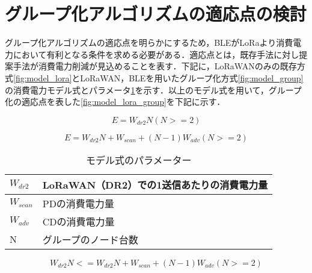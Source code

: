 \section{グループ化アルゴリズムの適応点の検討}
グループ化アルゴリズムの適応点を明らかにするため，BLEがLoRaより消費電力において有利となる条件を求める必要がある．適応点とは，既存手法に対し提案手法が消費電力削減が見込めることを表す．下記に，LoRaWANのみの既存方式\ref{fig:model_lora}とLoRaWAN，BLEを用いたグループ化方式\ref{fig:model_group}の消費電力モデル式とパラメータ\ref{fig:model_param}を示す．以上のモデル式を用いて，グループ化の適応点を表した\ref{fig:model_lora_group}を下記に示す．

\begin{equation}
    \label{fig:model_lora}
    E = W_{dr2}N (N>=2)
\end{equation}

\begin{equation}
    \label{fig:model_group}
    E = W_{dr2}N + W_{scan} + (N-1)W_{adv} (N>=2)
\end{equation}

\begin{table}[]
    \caption{モデル式のパラメーター}
    \label{fig:model_param}
    \centering
    \begin{tabular}{|l|l|}
    \hline
    $W_{dr2}$  & LoRaWAN（DR2）での1送信あたりの消費電力量 \\ \hline
    $W_{scan}$ & PDの消費電力量                   \\ \hline
    $W_{adv}$  & CDの消費電力量                   \\ \hline
    N           & グループのノード台数                 \\ \hline
    \end{tabular}
\end{table}

\begin{equation}
    \label{fig:model_lora_group}
    W_{dr2}N <= W_{dr2}N + W_{scan} + (N-1)W_{adv} (N>=2)
\end{equation}

